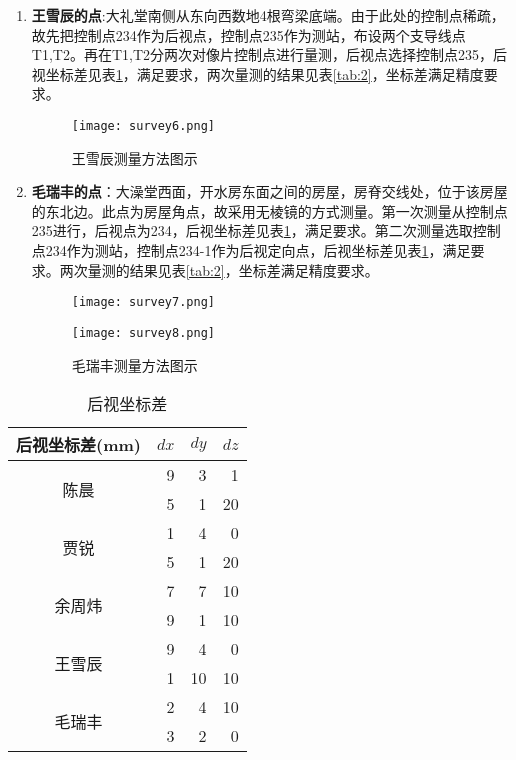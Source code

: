 \begin{enumerate}
\item\textbf{王雪辰的点}:大礼堂南侧从东向西数地4根弯梁底端。由于此处的控制点稀疏，故先把控制点234作为后视点，控制点235作为测站，布设两个支导线点T1,T2。再在T1,T2分两次对像片控制点进行量测，后视点选择控制点235，后视坐标差见表\ref{tab:1}，满足要求，两次量测的结果见表\ref{tab:2}，坐标差满足精度要求。
\begin{figure}[htbp]
  \centering
  \texttt{[image: survey6.png]}
  \caption{王雪辰测量方法图示}
  \end{figure}


\item\textbf{毛瑞丰的点}：大澡堂西面，开水房东面之间的房屋，房脊交线处，位于该房屋的东北边。此点为房屋角点，故采用无棱镜的方式测量。第一次测量从控制点235进行，后视点为234，后视坐标差见表\ref{tab:1}，满足要求。第二次测量选取控制点234作为测站，控制点234-1作为后视定向点，后视坐标差见表\ref{tab:1}，满足要求。两次量测的结果见表\ref{tab:2}，坐标差满足精度要求。

\begin{figure}[htbp]
  \begin{minipage}[c]{0.5\textwidth}
  \centering
  \texttt{[image: survey7.png]}
  \end{minipage}%
  \begin{minipage}[c]{0.5\textwidth}
  \centering
  \texttt{[image: survey8.png]}
  \end{minipage}
  \caption{毛瑞丰测量方法图示}
  \end{figure}

\end{enumerate}


\begin{table}[htbp]
\centering
\caption{后视坐标差}
\begin{tabular}{|c|r|r|r|}
\hline
\multicolumn{1}{|c|}{后视坐标差(\si{mm})} & \multicolumn{1}{p{2cm}|}{$dx$} & \multicolumn{1}{p{2cm}|}{$dy$} & \multicolumn{1}{p{2cm}|}{$dz$} \\
\hline
\multicolumn{1}{|c|}{\multirow{2}[4]{*}{陈晨}} & 9  & 3  & 1 \\
\cline{2-4}       & 5  & 1  & 20 \\
\hline
\multicolumn{1}{|c|}{\multirow{2}[4]{*}{贾锐}} & 1  & 4  & 0 \\
\cline{2-4}       & 5  & 1  & 20 \\
\hline
\multicolumn{1}{|c|}{\multirow{2}[4]{*}{余周炜}} & 7  & 7  & 10\\
\cline{2-4}       & 9  & 1  & 10 \\
\hline
\multicolumn{1}{|c|}{\multirow{2}[4]{*}{王雪辰}} & 9  & 4  & 0 \\
\cline{2-4}       & 1  & 10 & 10 \\
\hline
\multicolumn{1}{|c|}{\multirow{2}[4]{*}{毛瑞丰}} & 2  & 4  & 10\\
\cline{2-4}       & 3  & 2  & 0 \\
\hline
\end{tabular}%
\label{tab:1}%
\end{table}%

